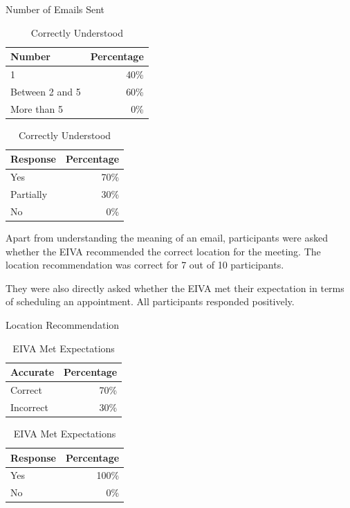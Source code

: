 \documentclass{article}
\begin{document}
\begin{table}[!htb]
	\begin{minipage}{.5\linewidth}
		\caption{Number of Emails Sent}
		\centering
		\begin{tabular}{lr}
			\hline
			\textbf{Number} & \textbf{Percentage} \\
			\hline
			1               & 40\%                \\
			Between 2 and 5 & 60\%                \\
			More than 5     & 0\%                 \\
			\hline
		\end{tabular}
	\end{minipage}%
	\hspace{.1cm}
	\begin{minipage}{.5\linewidth}
		\centering
		\caption{Correctly Understood}
		\begin{tabular}{lr}
			\hline
			\textbf{Response} & \textbf{Percentage} \\
			\hline
			Yes               & 70\%                \\
			Partially         & 30\%                \\
			No                & 0\%                 \\
			\hline
		\end{tabular}
	\end{minipage} 
\end{table}

Apart from understanding the meaning of an email, participants were asked whether the EIVA recommended the correct location for the meeting. The location recommendation was correct for 7 out of 10 participants.

They were also directly asked whether the EIVA met their expectation in terms of scheduling an appointment. All participants responded positively.

\begin{table}[!htb]
	\begin{minipage}{.5\linewidth}
		\caption{Location Recommendation}
		\centering
		\begin{tabular}{lr}
			\hline
			\textbf{Accurate} & \textbf{Percentage} \\
			\hline
			Correct           & 70\%                \\
			Incorrect         & 30\%                \\
			\hline
		\end{tabular}
	\end{minipage}%
	\hspace{.1cm}
	\begin{minipage}{.5\linewidth}
		\centering
		\caption{EIVA Met Expectations}
		\begin{tabular}{lr}
			\hline
			\textbf{Response} & \textbf{Percentage} \\
			\hline
			Yes               & 100\%               \\
			No                & 0\%                 \\
			\hline
		\end{tabular}
	\end{minipage} 
\end{table}
\end{document}
